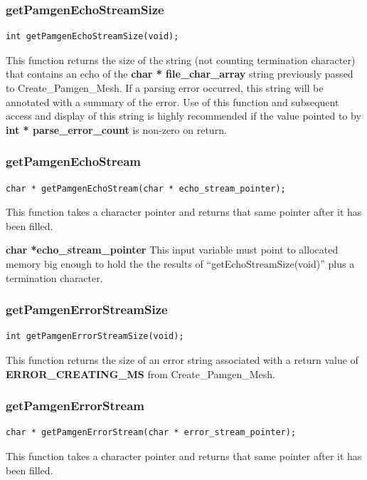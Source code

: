 \subsubsection{getPamgenEchoStreamSize}
{\ttfamily  \begin{verbatim}
int getPamgenEchoStreamSize(void);
\end{verbatim}}

This function returns the size of the string (not counting termination character) that contains an echo of the \textbf{char * file\_char\_array} string previously passed to Create\_Pamgen\_Mesh. If a parsing error occurred, this string will be annotated with a summary of the error. Use of this function and subsequent access and display of this string is highly recommended if the value pointed to by \textbf{int * parse\_error\_count} is non-zero on return.

\subsubsection{getPamgenEchoStream}
{\ttfamily  \begin{verbatim}
char * getPamgenEchoStream(char * echo_stream_pointer);
\end{verbatim}}
This function takes a character pointer and returns that same pointer after it has been filled.

{\setlength{\parindent}{0pt}
 \textbf{char *echo\_stream\_pointer} This input variable must point to allocated memory big enough to hold the the results of ``getEchoStreamSize(void)'' plus a termination character.
}

\subsubsection{getPamgenErrorStreamSize}
{\ttfamily  \begin{verbatim}
int getPamgenErrorStreamSize(void);
\end{verbatim}}
This function returns the size of an error string associated with a return value of \textbf{ERROR\_CREATING\_MS} from Create\_Pamgen\_Mesh.


\subsubsection{getPamgenErrorStream}
{\ttfamily  \begin{verbatim}
char * getPamgenErrorStream(char * error_stream_pointer);
\end{verbatim}}
This function takes a character pointer and returns that same pointer after it has been filled.

